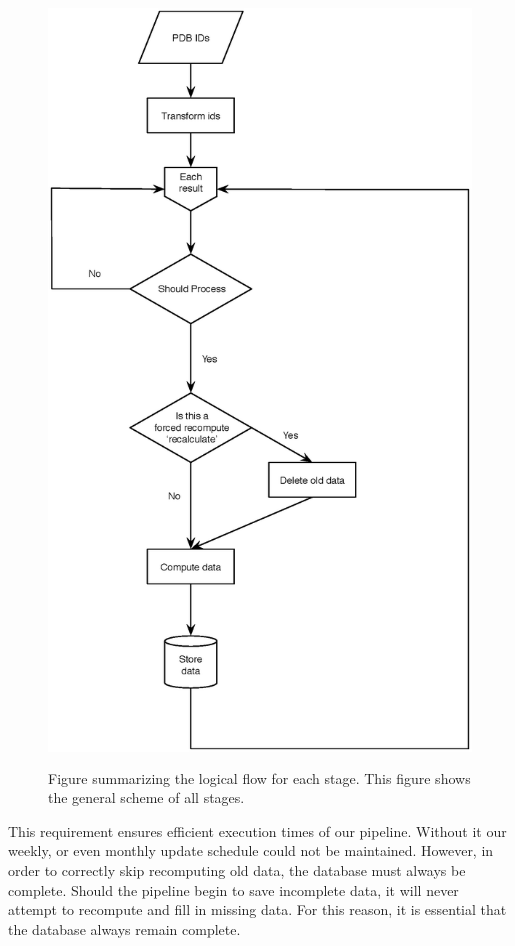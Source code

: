 \begin{figure}
  \includegraphics[height=8in]{chapter-2/figs/stage-flow}
\caption{Figure summarizing the logical flow for each stage. This figure shows
the general scheme of all stages.}
\label{fig:stage-flow}
\end{figure}

This requirement ensures efficient execution times of our pipeline. Without it
our weekly, or even monthly update schedule could not be maintained. However, in
order to correctly skip recomputing old data, the database must always be
complete. Should the pipeline begin to save incomplete data, it will never
attempt to recompute and fill in missing data. For this reason, it is essential
that the database always remain complete.

